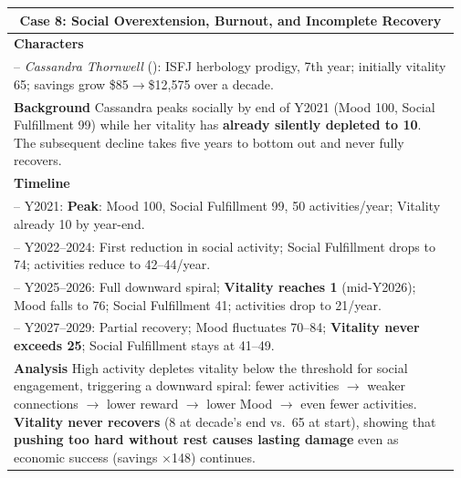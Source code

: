 \begin{table}[htbp]
\begin{tabular}{p{0.97\linewidth}}
\multicolumn{1}{c}{\textbf{Case 8: Social Overextension, Burnout, and Incomplete Recovery}}\\
\midrule
\textbf{Characters}\\
\quad -- \textit{Cassandra Thornwell} (\academy{}): ISFJ herbology prodigy, 7th year;
  initially vitality 65; savings grow \$85$\to$\$12,575 over a decade.\\[2pt]
\textbf{Background}\quad
Cassandra peaks socially by end of Y2021 (Mood 100, Social Fulfillment 99)
while her vitality has \textbf{already silently depleted to 10}.
The subsequent decline takes five years to bottom out
and never fully recovers.\\[2pt]
\textbf{Timeline}\\
\quad -- Y2021: \textbf{Peak}: Mood 100, Social Fulfillment 99, 50 activities/year;
  Vitality already 10 by year-end.\\
\quad -- Y2022--2024: First reduction in social activity; Social Fulfillment drops to 74;
  activities reduce to 42--44/year.\\
\quad -- Y2025--2026: Full downward spiral;
  \textbf{Vitality reaches 1} (mid-Y2026);
  Mood falls to 76; Social Fulfillment 41; activities drop to 21/year.\\
\quad -- Y2027--2029: Partial recovery; Mood fluctuates 70--84;
  \textbf{Vitality never exceeds 25}; Social Fulfillment stays at 41--49.\\[2pt]
\textbf{Analysis}\quad
High activity depletes vitality below the threshold for social engagement,
triggering a downward spiral:
fewer activities $\to$ weaker connections $\to$ lower reward $\to$ lower Mood
$\to$ even fewer activities.
\textbf{Vitality never recovers} (8 at decade's end vs.\ 65 at start),
showing that \textbf{pushing too hard without rest causes lasting damage}
even as economic success (savings $\times$148) continues.\\

\midrule


\end{tabular}
\end{table}
